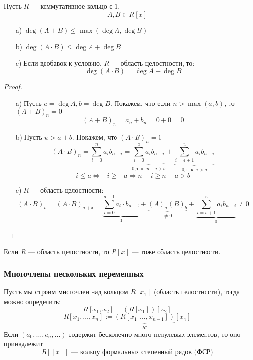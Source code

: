 \begin{statement}
\label{statement:01_3}
Пусть $R$ --- коммутативное кольцо с $1$.
\[
A, B \in R[x]
\]
\begin{itemize}
  \item [a) ] $\deg (A + B) \leq \max(\deg A, \deg B)$
  \item [b) ] $\deg (A \cdot B) \leq \deg A + \deg B$
  \item [c) ] Если вдобавок к условию, $R$ --- область целостности, то:
    \[
    \deg (A \cdot B) = \deg A + \deg B
    \]
\end{itemize}
\end{statement}
\begin{proof}
\begin{itemize}
  \item [a) ] Пусть $a = \deg A, b = \deg B$. Покажем, что если $n > \max(a, b)$, то $(A + B)_n = 0$
    \[
      (A + B)_n = a_n + b_n = 0 + 0 = 0
    \]
  \item [b) ] Пусть $n > a + b$. Покажем, что $(A \cdot B)_n = 0$
    \[
      (A \cdot B)_n = \sum_{i = 0}^{n} a_i b_{n - i} = \underbrace{\sum_{i = 0}^{a} a_i b_{n - i}}_{0, \text{т. к. }n - i > b} + \underbrace{\sum_{i = a + 1}^{n} a_i b_{n - i}}_{0, \text{т. к. $i > a$}}
    \]
    \[
    i \leq a \iff -i \geq -a \Rightarrow n - i \geq n - a > b
    \]
  \item [c) ] $R$ --- область целостности:
    \[
      (A \cdot B)_n = (A \cdot B)_{a + b} = \underbrace{\sum_{i = 0}^{a - 1} a_i \cdot b_{n - i}}_{0} + \underbrace{(A)_a (B)_b}_{\neq 0} + \underbrace{\sum_{i = a + 1}^{n} a_i b_{n - i}}_{0} \neq 0
    \]
\end{itemize}
\end{proof}
\begin{consequence}
Если $R$ --- область целостности, то $R[x]$ --- тоже область целостности.
\end{consequence}
\subsubsection{Многочлены нескольких переменных}
Пусть мы строим многочлен над кольцом $R[x_1]$ (область целостности), тогда можно определить:
\[
R[x_1, x_2] = (R[x_1])[x_2]
\]
\[
R[x_1, \ldots, x_n] := \underbrace{(R[x_1, \ldots, x_{n - 1}])}_{R'}[x_n]
\]
Если $(a_0, \ldots, a_n, \ldots)$ содержит бесконечно много ненулевых элементов, то оно принадлежит
\[
R[[x]] \text{ --- кольцу формальных степенный рядов (ФСР)}
\]
